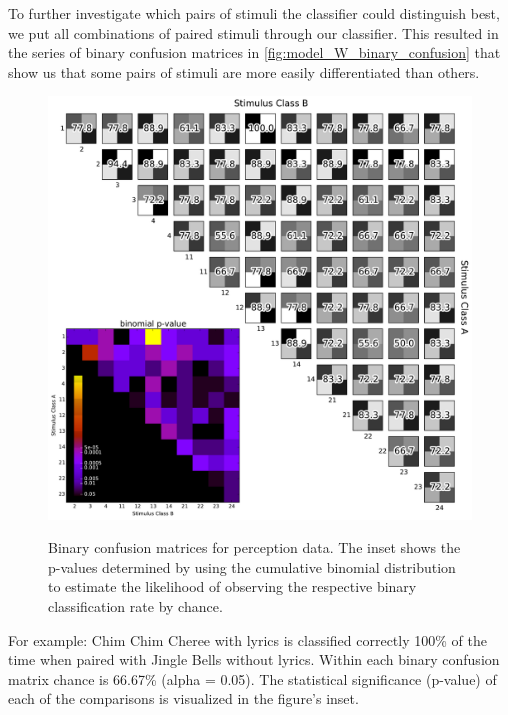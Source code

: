 To further investigate which pairs of stimuli the classifier could distinguish best, we put all combinations of paired stimuli through our classifier.
This resulted in the series of binary confusion matrices in \autoref{fig:model_W_binary_confusion} that show us that some pairs of stimuli are more easily differentiated than others. 
\begin{figure}[htb] 
  \begin{center}
    \includegraphics[width=.75\textwidth,keepaspectratio=true]{Figures/model_W_binary_confusion}
   \\\vspace{-0.8em}
    \caption{Binary confusion matrices for perception data.
    The inset shows the p-values determined by using the cumulative binomial distribution to estimate the likelihood of observing the respective binary classification rate by chance.}
    \label{fig:model_W_binary_confusion}
  \end{center}
  \vspace{-1em}
\end{figure}
For example: Chim Chim Cheree with lyrics is classified correctly 100\% of the time when paired with Jingle Bells without lyrics. 
Within each binary confusion matrix chance is 66.67\% (alpha = 0.05).
The statistical significance (p-value) of each of the comparisons is visualized in the figure's inset. 

